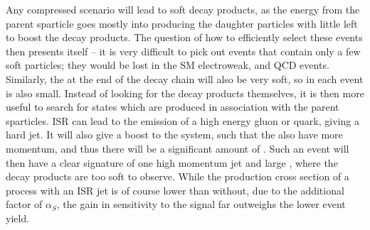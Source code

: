 Any compressed scenario will lead to soft decay products, 
as the energy from the parent sparticle goes mostly into producing the daughter particles with little left to boost the decay products.
The question of how to efficiently select these events then presents itself -- it is very difficult to pick out events that contain only a few soft particles; 
they would be lost in the \ac{SM} electroweak, \ttbar and \ac{QCD} events.
Similarly, the \chiOneZero at the end of the decay chain will also be very soft, so  \MET in each event is also small. 
Instead of looking for the decay products themselves, it is then more useful to search for 
states which are produced in association with the parent sparticles.
\ac{ISR} can lead to the emission of a high energy gluon or quark, giving a hard jet. 
It will also give a boost to the system, such that the \chiOneZero also have more momentum, and thus there will be a significant amount of \MET.
Such an event will then have a clear signature of one high momentum jet and large \MET, where the decay products are too soft to observe. 
While the production cross section of a process with an \ac{ISR} jet is of course lower than without, due to the additional factor of $\alpha_{S}$, the gain in sensitivity to the signal far outweighs the lower event yield.



